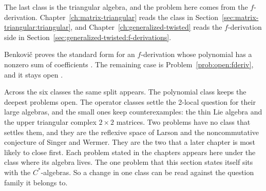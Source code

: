 The last class is the triangular algebra, and the problem here comes from the
$f$-derivation.
Chapter~\ref{ch:matrix-triangular} reads the class in
Section~\ref{sec:matrix-triangular:triangular}, and
Chapter~\ref{ch:generalized-twisted} reads the $f$-derivation side in
Section~\ref{sec:generalized-twisted:f-derivations}. %

Benkovi\v{c} proves the standard form for an $f$-derivation whose polynomial
has a nonzero sum of coefficients \cite[Theorem~1.1]{Benkovic2014}.
The remaining case is Problem~\ref{prob:open:fderiv}, and it stays open
\cite[Problem~1.2]{Benkovic2014}.

Across the six classes the same split appears. %
The polynomial class keeps the deepest problems open.
The operator classes settle the 2-local question for their large algebras, and
the small ones keep counterexamples: the thin Lie algebra and the upper
triangular complex $2\times2$ matrices.
Two problems have no class that settles them, and they are the reflexive space
of Larson and the noncommutative conjecture of Singer and Wermer.
They are the two that a later chapter is most likely to close first.
Each problem stated in the chapters appears here under the class where its
algebra lives.
The one problem that this section states itself sits with the
$C^{*}$-algebras.
So a change in one class can be read against the question family it belongs
to.
